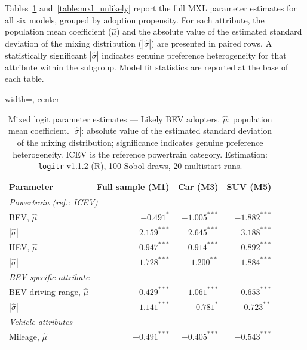 \documentclass[a4paper,fleqn]{cas-sc}   %
\begin{document}
Tables~\ref{table:mxl_likely} and~\ref{table:mxl_unlikely} report the full MXL parameter estimates for all six models, grouped by adoption propensity. For each attribute, the population mean coefficient ($\hat{\mu}$) and the absolute value of the estimated standard deviation of the mixing distribution ($|\hat{\sigma}|$) are presented in paired rows. A statistically significant $|\hat{\sigma}|$ indicates genuine preference heterogeneity for that attribute within the subgroup. Model fit statistics are reported at the base of each table.

\begin{table}[pos=H]
\caption{Mixed logit parameter estimates --- Likely BEV adopters. $\hat{\mu}$: population mean coefficient. $|\hat{\sigma}|$: absolute value of the estimated standard deviation of the mixing distribution; significance indicates genuine preference heterogeneity. ICEV is the reference powertrain category. Estimation: \texttt{logitr} v1.1.2 (R), 100 Sobol draws, 20 multistart runs.}
\label{table:mxl_likely}
\begin{adjustbox}{width=\textwidth, center}
{\renewcommand{\arraystretch}{1.25}
\begin{tabular}{lrrr}
\toprule
\textbf{Parameter} & \textbf{Full sample (M1)} & \textbf{Car (M3)} & \textbf{SUV (M5)} \\
\midrule
\multicolumn{4}{l}{\textit{Powertrain (ref.: ICEV)}} \\[2pt]
\quad BEV, $\hat{\mu}$               & $-0.491^{*}$    & $-1.005^{***}$  & $-1.882^{***}$ \\
\quad\quad $|\hat{\sigma}|$          & $2.159^{***}$   & $2.645^{***}$   & $3.188^{***}$  \\[3pt]
\quad HEV, $\hat{\mu}$               & $\phantom{-}0.947^{***}$  & $\phantom{-}0.914^{***}$ & $\phantom{-}0.892^{***}$ \\
\quad\quad $|\hat{\sigma}|$          & $1.728^{***}$   & $1.200^{**}$    & $1.884^{***}$  \\[3pt]
\multicolumn{4}{l}{\textit{BEV-specific attribute}} \\[2pt]
\quad BEV driving range, $\hat{\mu}$ & $\phantom{-}0.429^{***}$  & $\phantom{-}1.061^{***}$ & $\phantom{-}0.653^{***}$ \\
\quad\quad $|\hat{\sigma}|$          & $1.141^{***}$   & $0.781^{*}$     & $0.723^{**}$   \\[3pt]
\multicolumn{4}{l}{\textit{Vehicle attributes}} \\[2pt]
\quad Mileage, $\hat{\mu}$           & $-0.491^{***}$  & $-0.405^{***}$  & $-0.543^{***}$ \\

\end{tabular}}
\end{adjustbox}
\end{table}
\end{document}
